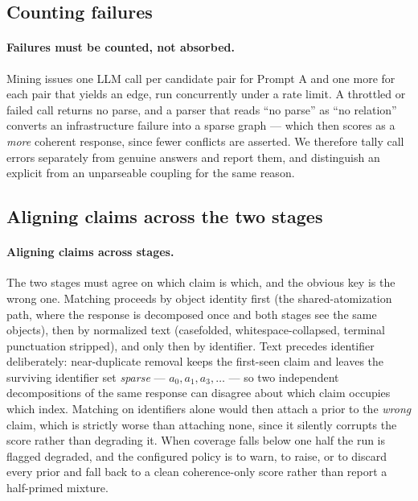 \subsection{Counting failures}
\label{app-mining-failures}

\paragraph{Failures must be counted, not absorbed.} Mining issues one LLM call per candidate pair for
Prompt A and one more for each pair that yields an edge, run concurrently under a rate limit. A
throttled or failed call returns no parse, and a parser that reads ``no parse'' as ``no relation''
converts an infrastructure failure into a sparse graph --- which then scores as a \emph{more}
coherent response, since fewer conflicts are asserted. We therefore tally call errors separately
from genuine  answers and report them, and distinguish an explicit 
from an unparseable coupling for the same reason.


\subsection{Aligning claims across the two stages}

\paragraph{Aligning claims across stages.} The two stages must agree on which claim is which, and the
obvious key is the wrong one. Matching proceeds by object identity first (the shared-atomization path,
where the response is decomposed once and both stages see the same objects), then by normalized text
(casefolded, whitespace-collapsed, terminal punctuation stripped), and only then by identifier. Text
precedes identifier deliberately: near-duplicate removal keeps the first-seen claim and leaves the
surviving identifier set \emph{sparse} --- $a_0, a_1, a_3, \dots$ --- so two independent
decompositions of the same response can disagree about which claim occupies which index. Matching on
identifiers alone would then attach a prior to the \emph{wrong} claim, which is strictly worse than
attaching none, since it silently corrupts the score rather than degrading it. When coverage falls
below one half the run is flagged degraded, and the configured policy is to warn, to raise, or to
discard every prior and fall back to a clean coherence-only score rather than report a half-primed
mixture.


